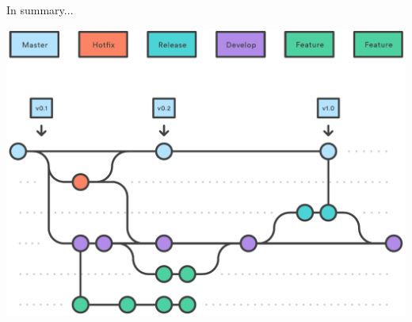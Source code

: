 \documentclass[svgnames]{beamer}
\begin{document}
\begin{frame}{In summary...}

    \begin{center}
        \includegraphics[scale=0.5]{05-_2_.pdf}    
    \end{center}

\end{frame}    
\end{document}
